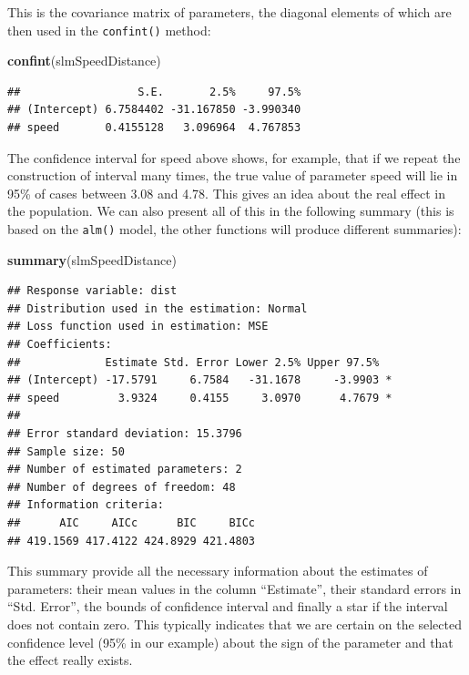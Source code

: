 \documentclass[
]{book}
\newenvironment{Shaded}{\begin{snugshade}}{\end{snugshade}}
\newcommand{\FunctionTok}[1]{\textcolor[rgb]{0.13,0.29,0.53}{\textbf{#1}}}
\newcommand{\NormalTok}[1]{#1}
\theoremstyle{definition}
\theoremstyle{definition}
\theoremstyle{definition}
\theoremstyle{definition}
\theoremstyle{remark}
\begin{document}
This is the covariance matrix of parameters, the diagonal elements of which are then used in the \texttt{confint()} method:

\begin{Shaded}
\begin{Highlighting}[]
\FunctionTok{confint}\NormalTok{(slmSpeedDistance)}
\end{Highlighting}
\end{Shaded}

\begin{verbatim}
##                  S.E.       2.5%     97.5%
## (Intercept) 6.7584402 -31.167850 -3.990340
## speed       0.4155128   3.096964  4.767853
\end{verbatim}

The confidence interval for speed above shows, for example, that if we repeat the construction of interval many times, the true value of parameter speed will lie in 95\% of cases between 3.08 and 4.78. This gives an idea about the real effect in the population. We can also present all of this in the following summary (this is based on the \texttt{alm()} model, the other functions will produce different summaries):

\begin{Shaded}
\begin{Highlighting}[]
\FunctionTok{summary}\NormalTok{(slmSpeedDistance)}
\end{Highlighting}
\end{Shaded}

\begin{verbatim}
## Response variable: dist
## Distribution used in the estimation: Normal
## Loss function used in estimation: MSE
## Coefficients:
##             Estimate Std. Error Lower 2.5% Upper 97.5%  
## (Intercept) -17.5791     6.7584   -31.1678     -3.9903 *
## speed         3.9324     0.4155     3.0970      4.7679 *
## 
## Error standard deviation: 15.3796
## Sample size: 50
## Number of estimated parameters: 2
## Number of degrees of freedom: 48
## Information criteria:
##      AIC     AICc      BIC     BICc 
## 419.1569 417.4122 424.8929 421.4803
\end{verbatim}

This summary provide all the necessary information about the estimates of parameters: their mean values in the column ``Estimate'', their standard errors in ``Std. Error'', the bounds of confidence interval and finally a star if the interval does not contain zero. This typically indicates that we are certain on the selected confidence level (95\% in our example) about the sign of the parameter and that the effect really exists.
\end{document}

